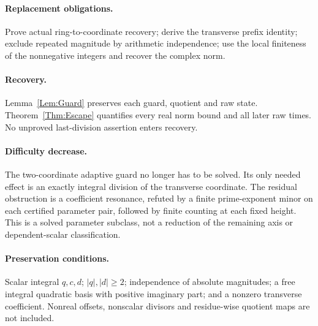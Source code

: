 \documentclass[11pt,letterpaper]{article}
\begin{document}
\paragraph{Replacement obligations.}
Prove actual ring-to-coordinate recovery; derive the transverse prefix
identity; exclude repeated magnitude by arithmetic independence; use the
local finiteness of the nonnegative integers and recover the complex norm.
\paragraph{Recovery.}
Lemma~\ref{Lem:Guard} preserves each guard, quotient and raw state.
Theorem~\ref{Thm:Escape} quantifies every real norm bound and all later
raw times. No unproved last-division assertion enters recovery.
\paragraph{Difficulty decrease.}
The two-coordinate adaptive guard no longer has to be solved. Its only
needed effect is an exactly integral division of the transverse coordinate.
The residual obstruction is a coefficient resonance, refuted by a finite
prime-exponent minor on each certified parameter pair, followed by finite
counting at each fixed height. This is a solved parameter subclass, not a
reduction of the remaining axis or dependent-scalar classification.
\paragraph{Preservation conditions.}
Scalar integral \(q,c,d\); \(|q|,|d|\ge2\); independence of absolute
magnitudes; a free integral quadratic basis with positive imaginary part;
and a nonzero transverse coefficient. Nonreal offsets, nonscalar divisors
and residue-wise quotient maps are not included.
\end{document}
